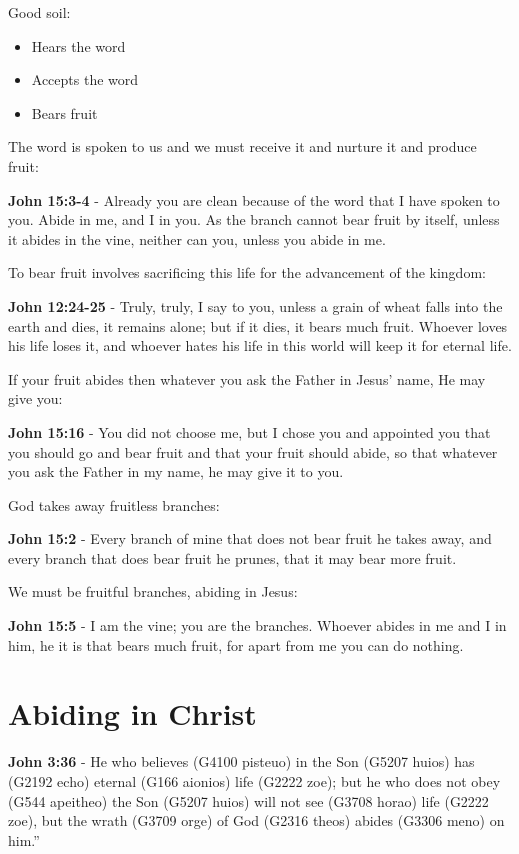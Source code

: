 \documentclass[11pt]{article}
\begin{document}
Good soil:
\begin{itemize}
\item Hears the word
\item Accepts the word
\item Bears fruit
\end{itemize}

The word is spoken to us and we must receive it and nurture it and produce fruit:

\textbf{John 15:3-4} - Already you are clean because of the word that I have spoken to you. Abide in me, and I in you. As the branch cannot bear fruit by itself, unless it abides in the vine, neither can you, unless you abide in me.

To bear fruit involves sacrificing this life for the advancement of the kingdom:

\textbf{John 12:24-25} - Truly, truly, I say to you, unless a grain of wheat falls into the earth and dies, it remains alone; but if it dies, it bears much fruit. Whoever loves his life loses it, and whoever hates his life in this world will keep it for eternal life.

If your fruit abides then whatever you ask the Father in Jesus' name, He may give you:

\textbf{John 15:16} - You did not choose me, but I chose you and appointed you that you should go and bear fruit and that your fruit should abide, so that whatever you ask the Father in my name, he may give it to you.

God takes away fruitless branches:

\textbf{John 15:2} - Every branch of mine that does not bear fruit he takes away, and every branch that does bear fruit he prunes, that it may bear more fruit.

We must be fruitful branches, abiding in Jesus:

\textbf{John 15:5} - I am the vine; you are the branches. Whoever abides in me and I in him, he it is that bears much fruit, for apart from me you can do nothing.

\section{Abiding in Christ}
\label{sec:org99cc0dd}
\textbf{John 3:36} - He who believes (G4100 pisteuo) in the Son (G5207 huios) has (G2192 echo) eternal (G166 aionios) life (G2222 zoe); but he who does not obey (G544 apeitheo) the Son (G5207 huios) will not see (G3708 horao) life (G2222 zoe), but the wrath (G3709 orge) of God (G2316 theos) abides (G3306 meno) on him.”
\end{document}
